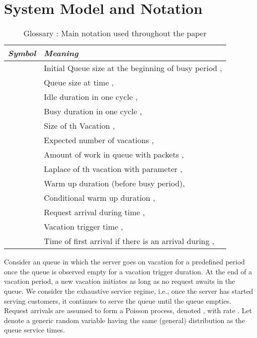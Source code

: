 \documentclass[journal]{IEEEtran}
\begin{document}
\section{System Model and Notation}
\label{s:model}
\begin{table}

\centering
\begin{tabular}{p{}p{}}
\hline
{\it Symbol} & {\it Meaning}\\
\hline
\hline  & Initial Queue size at the beginning of busy period ,\\
 & Queue size at time  ,\\
 & Idle duration in one cycle ,\\
 & Busy duration in one cycle ,\\
 & Size of th Vacation ,\\
 & Expected number of vacations ,\\
 & Amount of work in queue with  packets ,\\
 & Laplace of th vacation with parameter  ,\\
 & Warm up duration (before busy period),\\
 & Conditional warm up duration ,\\
 & Request arrival during time  ,\\
 & Vacation trigger time ,\\
 & Time of first arrival if there is an arrival during  ,\\
\hline
\end{tabular}\caption{Glossary : Main notation used throughout the paper}\label{tab:notation}
\end{table}




Consider an  queue in which the server goes on vacation for a predefined period once the queue is observed empty for a vacation trigger duration. At the end of a vacation period, a new vacation initiates as long as no request awaits in the queue. We consider the exhaustive service regime, i.e., once the server has started serving customers, it continues to serve the queue until the queue empties. Request arrivals are assumed to form a Poisson process, denoted , with rate . Let  denote a generic random variable having the same (general) distribution as the queue service times.
\end{document}
